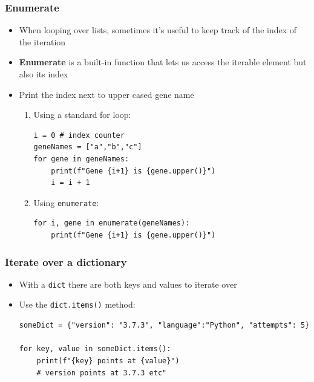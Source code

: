 \documentclass[xcolor=table]{beamer}
\begin{document}
\begin{frame}[fragile]
\frametitle{Enumerate}

\begin{itemize}\addtolength{\itemsep}{0.5\baselineskip}
\item<1-> When looping over lists, sometimes it's useful to keep track of the
index of the iteration

\item<2-> \textbf{Enumerate} is a built-in function that lets us access the
iterable element but also its index

\item<3-> Print the index next to upper cased gene name

\begin{enumerate}\addtolength{\itemsep}{-1\baselineskip}

\item<3-> Using a standard for loop:
\begin{lstlisting}[style=python]
i = 0 # index counter
geneNames = ["a","b","c"]
for gene in geneNames:
    print(f"Gene {i+1} is {gene.upper()}")
    i = i + 1
\end{lstlisting}

\item<4-> Using \texttt{enumerate}:
\begin{lstlisting}[style=python]
for i, gene in enumerate(geneNames):
    print(f"Gene {i+1} is {gene.upper()}")
\end{lstlisting}

\end{enumerate}
\end{itemize}

\end{frame}


\begin{frame}[fragile]
\frametitle{Iterate over a dictionary}
\begin{itemize}\addtolength{\itemsep}{0.5\baselineskip}
        \item With a \texttt{dict} there are both keys and values to iterate over
        \item Use the \texttt{dict.items()} method:
\begin{lstlisting}[style=python]
someDict = {"version": "3.7.3", "language":"Python", "attempts": 5}

for key, value in someDict.items():
    print(f"{key} points at {value}")
    # version points at 3.7.3 etc"
\end{lstlisting}
    \end{itemize}
\end{frame}
\end{document}

